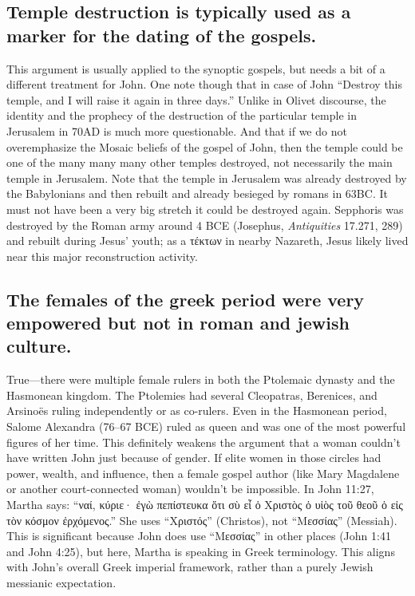 \subsection{Temple destruction is typically used as a marker for the dating of the gospels.}\label{subsec:temple-destruction-is-typically-used-as-a-marker-for-the-dating-of-the-gospels.}

This argument is usually applied to the synoptic gospels, but needs a bit of a different treatment for John.
One note though that in case of John ``Destroy this temple, and I will raise it again in three days.'' Unlike in Olivet discourse, the identity and the prophecy of the destruction of the particular temple in Jerusalem in 70AD is much more questionable.
And that if we do not overemphasize the Mosaic beliefs of the gospel of John, then the temple could be one of the many many many other temples destroyed, not necessarily the main temple in Jerusalem.
Note that the temple in Jerusalem was already destroyed by the Babylonians and then rebuilt and already besieged by romans in 63BC.
It must not have been a very big stretch it could be destroyed again.
Sepphoris was destroyed by the Roman army around 4 BCE (Josephus, \emph{Antiquities} 17.271, 289) and rebuilt during Jesus' youth; as a τέκτων in nearby Nazareth, Jesus likely lived near this major reconstruction activity.

\subsection{The females of the greek period were very empowered but not in roman and jewish culture.}\label{subsec:the-females-of-the-greek-period-were-very-empowered-but-not-in-roman-and-jewish-culture.}

True---there were multiple female rulers in both the Ptolemaic dynasty and the Hasmonean kingdom.
The Ptolemies had several Cleopatras, Berenices, and Arsinoës ruling independently or as co-rulers.
Even in the Hasmonean period, Salome Alexandra (76--67 BCE) ruled as queen and was one of the most powerful figures of her time.
This definitely weakens the argument that a woman couldn't have written John just because of gender.
If elite women in those circles had power, wealth, and influence, then a female gospel author (like Mary Magdalene or another court-connected woman) wouldn't be impossible.
In John 11:27, Martha says: ``ναί, κύριε· ἐγὼ πεπίστευκα ὅτι σὺ εἶ ὁ Χριστὸς ὁ υἱὸς τοῦ θεοῦ ὁ εἰς τὸν κόσμον ἐρχόμενος.'' She uses ``Χριστός'' (Christos), not ``Μεσσίας'' (Messiah).
This is significant because John does use ``Μεσσίας'' in other places (John 1:41 and John 4:25), but here, Martha is speaking in Greek terminology.
This aligns with John's overall Greek imperial framework, rather than a purely Jewish messianic expectation.

